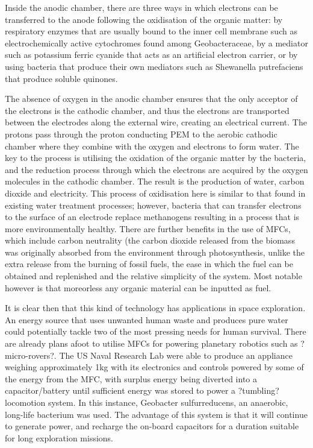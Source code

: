 \documentclass[12pt]{article}
\begin{document}
Inside the anodic chamber, there are three ways in which electrons can be transferred to the anode following the oxidisation of the organic matter: by respiratory enzymes that are usually bound to the inner cell membrane such as electrochemically active cytochromes found among Geobacteraceae, by a mediator such as potassium ferric cyanide that acts as an artificial electron carrier, or by using bacteria that produce their own mediators such as Shewanella putrefaciens that produce soluble quinones.\cite{ghangrekar2006wastewater} \cite{min2004continuous}

The absence of oxygen in the anodic chamber ensures that the only acceptor of the electrons is the cathodic chamber, and thus the electrons are transported between the electrodes along the external wire, creating an electrical current. The protons pass through the proton conducting PEM to the aerobic cathodic chamber where they combine with the oxygen and electrons to form water. The key to the process is utilising the oxidation of the organic matter by the bacteria, and the reduction process through which the electrons are acquired by the oxygen molecules in the cathodic chamber. The result is the production of water, carbon dioxide and electricity. This process of oxidisation here is similar to that found in existing water treatment processes; however, bacteria that can transfer electrons to the surface of an electrode replace methanogens resulting in a process that is more environmentally healthy.\cite{ghangrekar2006microbial} There are further benefits in the use of MFCs, which include carbon neutrality (the carbon dioxide released from the biomass was originally absorbed from the environment through photosynthesis, unlike the extra release from the burning of fossil fuels, the ease in which the fuel can be obtained and replenished and the relative simplicity of the system. Most notable however is that moreorless any organic material can be inputted as fuel.  \cite{liu2004production}

It is clear then that this kind of technology has applications in space exploration. An energy source that uses unwanted human waste and produces pure water could potentially tackle two of the most pressing needs for human survival. There are already plans afoot to utilise MFCs for powering planetary robotics such as ?micro-rovers?. The US Naval Research Lab were able to produce an appliance weighing approximately 1kg with its electronics and controls powered by some of the energy from the MFC, with surplus energy being diverted into a capacitor/battery until sufficient energy was stored to power a ?tumbling? locomotion system. In this instance, Geobacter sulfurreducens, an anaerobic, long-life bacterium was used. The advantage of this system is that it will continue to generate power, and recharge the on-board capacitors for a duration suitable for long exploration missions. \cite{society2012microbial}
\end{document}
